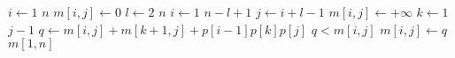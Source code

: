 \begin{codebox}
\li \For $i \gets 1$ \To $n$
\li \Do 
        $m[i,j] \gets 0$
    \End
\li \For $l \gets 2$ \To $n$
\li \Do \For $i \gets 1$ \To $n-l+1$
\li     \Do
            $j \gets i+l-1$
\li         $m[i,j] \gets +\infty$
\li         \For $k \gets 1$ \To $j-1$
\li         \Do
                $q \gets m[i,j]+m[k+1,j]+p[i-1]p[k]p[j]$
\li             \If $q < m[i,j]$
\li             \Then $m[i,j] \gets q$
                \End
            \End
        \End
    \End
\li \Return $m[1,n]$
\end{codebox}